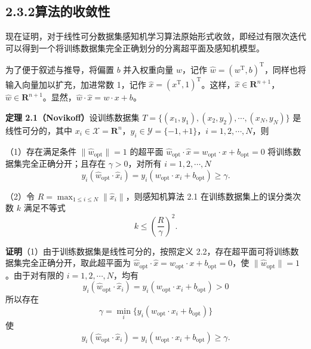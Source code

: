 \documentclass[UTF8, 12pt, fontset=fandol, oneside]{ctexart}
\begin{document}
\subsection*{2.3.2\quad 算法的收敛性}

现在证明，对于线性可分数据集感知机学习算法原始形式收敛，即经过有限次迭代可以得到一个将训练数据集完全正确划分的分离超平面及感知机模型。

为了便于叙述与推导，将偏置 $b$ 并入权重向量 $w$，记作 $\hat{w}=(w^\mathrm{T},b)^\mathrm{T}$，同样也将输入向量加以扩充，加进常数 1，记作 $\hat{x}=(x^\mathrm{T},1)^\mathrm{T}$。这样，$\hat{x}\in\mathbf{R}^{n+1}$，$\hat{w}\in\mathbf{R}^{n+1}$。显然，$\hat{w}\cdot\hat{x}=w\cdot x+b$。

\noindent\textbf{定理 2.1（Novikoff）}\quad 设训练数据集 $T=\{(x_1,y_1),(x_2,y_2),\cdots,(x_N,y_N)\}$ 是线性可分的，其中 $x_i\in\mathcal{X}=\mathbf{R}^n$，$y_i\in\mathcal{Y}=\{-1,+1\}$，$i=1,2,\cdots,N$，则

（1）存在满足条件 $\|\hat{w}_{\mathrm{opt}}\|=1$ 的超平面 $\hat{w}_{\mathrm{opt}}\cdot\hat{x}=w_{\mathrm{opt}}\cdot x+b_{\mathrm{opt}}=0$ 将训练数据集完全正确分开；且存在 $\gamma>0$，对所有 $i=1,2,\cdots,N$
\begin{equation}
  y_i(\hat{w}_{\mathrm{opt}}\cdot\hat{x}_i)
  =y_i(w_{\mathrm{opt}}\cdot x_i+b_{\mathrm{opt}})\ge\gamma.
  \tag{2.8}
\end{equation}

（2）令 $R=\max_{1\le i\le N}\|\hat{x}_i\|$，则感知机算法 2.1 在训练数据集上的误分类次数 $k$ 满足不等式
\begin{equation}
  k\le\left(\frac{R}{\gamma}\right)^2.
  \tag{2.9}
\end{equation}

\noindent\textbf{证明}\quad （1）由于训练数据集是线性可分的，按照定义 2.2，存在超平面可将训练数据集完全正确分开，取此超平面为 $\hat{w}_{\mathrm{opt}}\cdot\hat{x}=w_{\mathrm{opt}}\cdot x+b_{\mathrm{opt}}=0$，使 $\|\hat{w}_{\mathrm{opt}}\|=1$。由于对有限的 $i=1,2,\cdots,N$，均有
\[
  y_i(\hat{w}_{\mathrm{opt}}\cdot\hat{x}_i)
  =y_i(w_{\mathrm{opt}}\cdot x_i+b_{\mathrm{opt}})>0
\]
所以存在
\[
  \gamma=\min_i\{y_i(w_{\mathrm{opt}}\cdot x_i+b_{\mathrm{opt}})\}
\]
使
\[
  y_i(\hat{w}_{\mathrm{opt}}\cdot\hat{x}_i)
  =y_i(w_{\mathrm{opt}}\cdot x_i+b_{\mathrm{opt}})\ge\gamma.
\]
\end{document}

